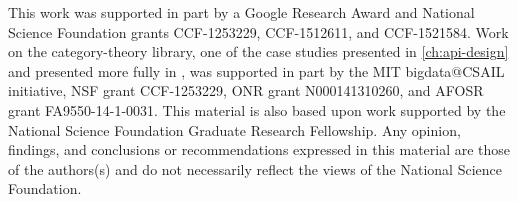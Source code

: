 This work was supported in part by a Google Research Award and National Science Foundation grants CCF-1253229, CCF-1512611, and CCF-1521584.
Work on the category-theory library, one of the case studies presented in \autoref{ch:api-design} and presented more fully in , was supported in part by the MIT bigdata@CSAIL initiative, NSF grant CCF-1253229, ONR grant N000141310260, and AFOSR grant FA9550-14-1-0031.
This material is also based upon work supported by the National Science Foundation Graduate Research Fellowship. %
%
Any opinion, findings, and conclusions or recommendations expressed in this material are those of the authors(s) and do not necessarily reflect the views of the National Science Foundation.

